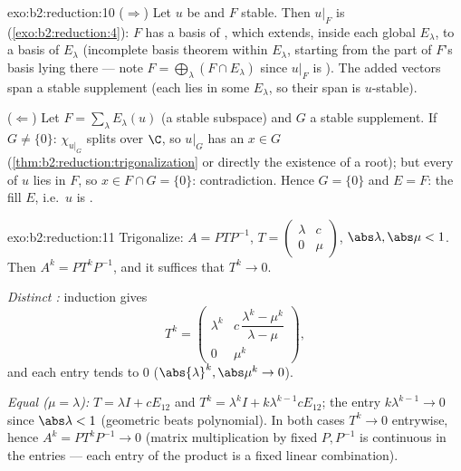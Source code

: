 \begin{solution}{exo:b2:reduction:10}
($\Rightarrow$) Let $u$ be  and $F$ stable. Then
$u|_F$ is  (\cref{exo:b2:reduction:4}): $F$ has a
basis of , which extends, inside each global 
$E_\lambda$, to a basis of $E_\lambda$ (incomplete basis theorem
within $E_\lambda$, starting from the part of $F$'s basis lying
there --- note $F = \bigoplus_\lambda (F \cap E_\lambda)$ since
$u|_F$ is ). The added vectors span a stable
supplement (each lies in some $E_\lambda$, so their span is
$u$-stable).

($\Leftarrow$) Let $F = \sum_\lambda E_\lambda(u)$ (a stable
subspace) and $G$ a stable supplement. If $G \neq \{0\}$: $\chi_{u|_G}$
splits over $\C$, so $u|_G$ has an  $x \in G$
(\cref{thm:b2:reduction:trigonalization} or directly the existence
of a root); but every  of $u$ lies in $F$, so $x \in F
\cap G = \{0\}$: contradiction. Hence $G = \{0\}$ and $E = F$: the
 fill $E$, i.e.\ $u$ is .
\end{solution}

\begin{solution}{exo:b2:reduction:11}
Trigonalize: $A = PTP^{-1}$, $T = \begin{pmatrix} \lambda & c\\ 0 &
\mu\end{pmatrix}$, $\abs\lambda, \abs\mu < 1$. Then $A^k =
PT^kP^{-1}$, and it suffices that $T^k \to 0$.

\emph{Distinct :} induction gives
\[
T^k = \begin{pmatrix}
\lambda^k & c\,\dfrac{\lambda^k - \mu^k}{\lambda - \mu}\\[4pt]
0 & \mu^k
\end{pmatrix},
\]
and each entry tends to $0$ ($\abs{\lambda}^k, \abs\mu^k \to 0$).

\emph{Equal  ($\mu = \lambda$):} $T = \lambda I + cE_{12}$
and $T^k = \lambda^k I + k\lambda^{k-1}cE_{12}$; the entry
$k\lambda^{k-1} \to 0$ since $\abs\lambda < 1$ (geometric beats
polynomial). In both cases $T^k \to 0$ entrywise, hence $A^k =
PT^kP^{-1} \to 0$ (matrix multiplication by fixed $P, P^{-1}$ is
continuous in the entries --- each entry of the product is a fixed
linear combination).
\end{solution}

